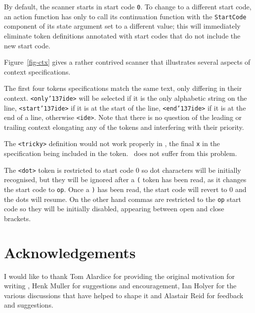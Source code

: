 By default, the scanner starts in start code \mbox{\tt 0}.  To change to a different
start code, an action function has only to call its continuation function with
the \mbox{\tt StartCode} component of its state argument set to a different value; this
will immediately eliminate token definitions annotated with start codes that do
not include the new start code.

Figure~\ref{fig-ctx} gives a rather contrived scanner that illustrates several
aspects of context specifications.

The first four tokens specifications match the same text, only differing in
their context.  \mbox{\tt <only{\char'137}ide>} will be selected if it is the only alphabetic
string on the line, \mbox{\tt <start{\char'137}ide>} if it is at the start of the line,
\mbox{\tt <end{\char'137}ide>} if it is at the end of a line, otherwise \mbox{\tt <ide>}.  Note that there
is no question of the leading or trailing context elongating any of the tokens
and interfering with their priority.

The \mbox{\tt <tricky>} definition would not work properly in \lex, the final \mbox{\tt x} in the
specification being included in the token.  \lx\ does not suffer from this
problem.

The \mbox{\tt <dot>} token is restricted to start code 0 so dot characters will be
initially recognised, but they will be ignored after a \mbox{\tt (} token has been read,
as it changes the start code to \mbox{\tt op}.  Once a \mbox{\tt )} has been read, the start code
will revert to 0 and the dots will resume.  On the other hand commas are
restricted to the \mbox{\tt op} start code so they will be initially disabled, appearing
between open and close brackets.


\section*{Acknowledgements}

I would like to thank Tom Alardice for providing the original motivation for
writing \lx, Henk Muller for suggestions and encouragement, Ian Holyer for the
various discussions that have helped to shape it and Alastair Reid for feedback
and suggestions.

